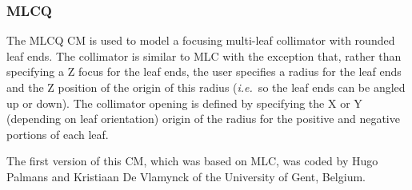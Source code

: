\documentclass[12pt,twoside]{article}
\newcommand{\ie}{{\em i.e.}}
\begin{document}
\subsubsection{MLCQ}
\label{mlcq}
\renewcommand{\rightmark}{MLCQ CM}
The MLCQ CM is used to model a focusing multi-leaf collimator
with rounded leaf
ends.  The collimator is similar to MLC with the exception that, rather
than specifying a Z focus for the leaf ends, the user specifies a radius
for the leaf ends and the Z position of the origin of this radius (\ie\ so
the leaf ends can be angled up or down).  The collimator opening is defined
by specifying the X or Y (depending on leaf orientation) origin of the
radius for the positive and negative portions of each leaf.

The first version of this CM, which was based on MLC, was coded by Hugo
Palmans and Kristiaan De Vlamynck of the University of Gent, Belgium.
\end{document}
